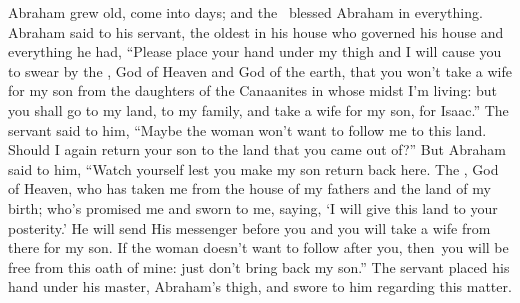 
\begin{inparaenum}
   Abraham grew old, come into days; and the \lord\ blessed Abraham in everything.%
   Abraham said to his servant, the oldest in his house who governed his house and everything he had, ``Please place your hand under my thigh%
   and I will cause you to swear by the \lord, God of Heaven and God of the earth, that you won't take a wife for my son from the daughters of the Canaanites in whose midst I'm living:%
   but you shall go to my land, to my family, and take a wife for my son, for Isaac.''%
   The servant said to him, ``Maybe the woman won't want to follow me to this land. Should I again return your son to the land that you came out of?''%
   But Abraham said to him, ``Watch yourself lest you make my son return back here.%
   The \lord, God of Heaven, who has taken me from the house of my fathers and the land of my birth; who's promised me and sworn to me, saying, `I will give this land to your posterity.' He will send His messenger before you and you will take a wife from there for my son.%
   If the woman doesn't want to follow after you, then\understood{}\ you will be free from this oath of mine: just don't bring back my son.''%
   The servant placed his hand under his master, Abraham's thigh, and swore to him regarding this matter.%


\end{inparaenum}
